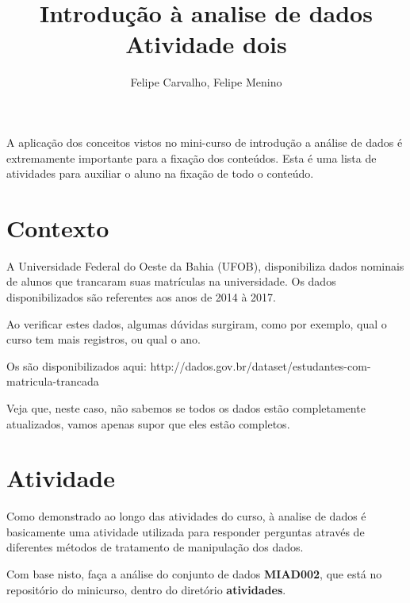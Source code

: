 \documentclass[12pt]{article}
\title{Introdução à analise de dados\\ Atividade dois}
\author{Felipe Carvalho\inst{1}, Felipe Menino\inst{2}}
\begin{document}
 

\maketitle

     
\begin{resumo} 
    A aplicação dos conceitos vistos no mini-curso de introdução a análise de dados é extremamente importante para a fixação dos conteúdos. Esta é uma lista de atividades para auxiliar o aluno na fixação de todo o conteúdo.
\end{resumo}

\section{Contexto}

A Universidade Federal do Oeste da Bahia (UFOB), disponibiliza dados nominais de alunos que trancaram suas matrículas na universidade. Os dados disponibilizados são referentes aos anos de 2014 à 2017.

Ao verificar estes dados, algumas dúvidas surgiram, como por exemplo, qual o curso tem mais registros, ou qual o ano.

Os são disponibilizados aqui: http://dados.gov.br/dataset/estudantes-com-matricula-trancada

Veja que, neste caso, não sabemos se todos os dados estão completamente atualizados, vamos apenas supor que eles estão completos.

\section{Atividade}

Como demonstrado ao longo das atividades do curso, à analise de dados é basicamente uma atividade utilizada para responder perguntas através de diferentes métodos de tratamento de manipulação dos dados.

Com base nisto, faça a análise do conjunto de dados \textbf{MIAD002}, que está no repositório do minicurso, dentro do diretório \textbf{atividades}.
\end{document}
